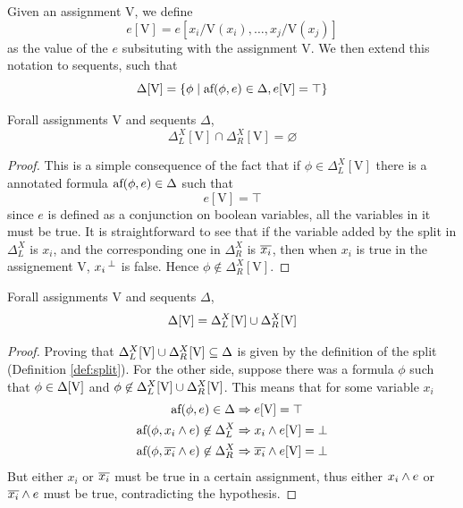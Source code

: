 \documentclass[a4paper, 12pt, english]{report}
\begin{document}
\begin{define}
	Given an assignment V, we define
		$$ e[\mathrm{V}] = e[x_i / \mathrm{V}(x_i), \dots, x_j / \mathrm{V}(x_j)] $$
	as the value of the $e$ subsituting with the assignment V.
	We then extend this notation to sequents, such that
		$$ \Delta[\mathrm{V}] = \{ \phi \mid \text{af}(\phi, e) \in \Delta , e[\mathrm{V}] = \top \} $$
\end{define}
\begin{lemma}
	\label{lemma:cap}
	Forall assignments V and sequents $\Delta$,
	$$ \Delta_L^X[\mathrm{V}] \cap \Delta_R^X[\mathrm{V}] = \varnothing $$
\end{lemma}
\begin{proof}
	This is a simple consequence of the fact that if $\phi \in \Delta_L^X[\text{V}]$ there is a annotated formula $\text{af}(\phi, e) \in \Delta$ such that 
	$$ e[\text{V}] = \top $$
	since $e$ is defined as a conjunction on boolean variables, all the variables in it must be true.
	It is straightforward to see that if the variable added by the split in $\Delta_L^X$ is $x_i$, and the corresponding one in $\Delta_R^X$ is $\overline{x_i}$, then when $x_i$ is true in the assignement V, ${x_i}\,^{\bot}$ is false.
	Hence $\phi \not \in \Delta_R^X[\text{V}]$.
\end{proof}
\begin{lemma}
	\label{lemma:cup}
	Forall assignments V and sequents $\Delta$,
	$$ \Delta[\mathrm{V}] = \Delta_L^X[\mathrm{V}] \cup \Delta_R^X[\mathrm{V}] $$
\end{lemma}
\begin{proof}
	Proving that $\Delta_L^X[\mathrm{V}] \cup \Delta_R^X[\mathrm{V}] \subseteq \Delta$ is given by the definition of the split (Definition \ref{def:split}).
	For the other side, suppose there was a formula $\phi$ such that $\phi \in \Delta[\mathrm{V}]$ and $\phi \not \in \Delta_L^X[\mathrm{V}] \cup \Delta_R^X[\mathrm{V}]$.
	This means that for some variable $x_i$ 
	\begin{align*}
		\text{af}(\phi, e) \in \Delta &\Rightarrow e[\mathrm{V}] = \top \\
		\text{af}(\phi, x_i \wedge e) \not \in \Delta_L^X &\Rightarrow x_i \wedge e[\mathrm{V}] = \bot \\
		\text{af}(\phi, \overline{x_i} \wedge e) \not \in \Delta_R^X &\Rightarrow \overline{x_i} \wedge e[\mathrm{V}] = \bot
	\end{align*}
	But either $x_i$ or $\overline{x_i}$ must be true in a certain assignment, thus either $x_i \wedge e$ or $\overline{x_i} \wedge e$ must be true, contradicting the hypothesis.
\end{proof}
\end{document}
